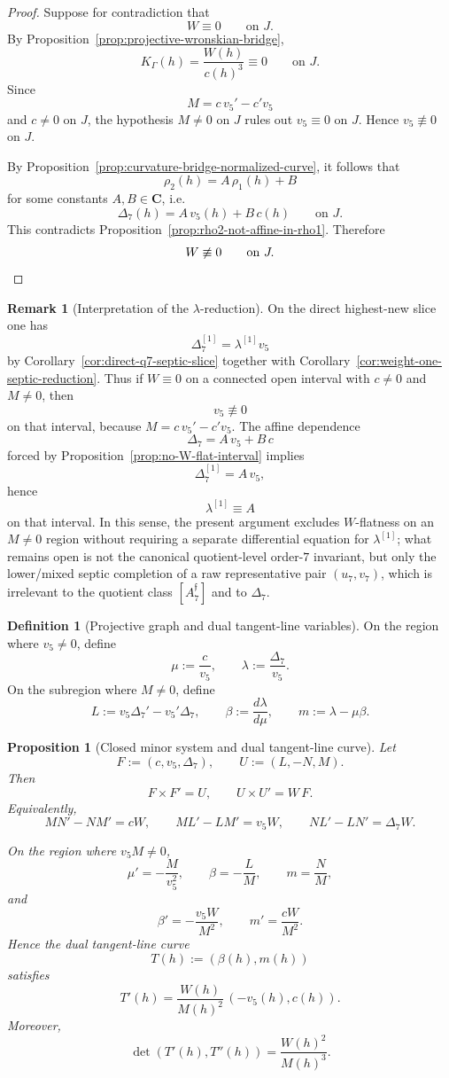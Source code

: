 \documentclass[11pt,a4paper]{amsart}
\theoremstyle{plain}
\newtheorem{proposition}[theorem]{Proposition}
\theoremstyle{definition}
\newtheorem{definition}[theorem]{Definition}
\newtheorem{remark}[theorem]{Remark}
\begin{document}
\begin{proof}
Suppose for contradiction that
\[
W\equiv 0
\qquad\text{on }J.
\]
By Proposition~\ref{prop:projective-wronskian-bridge},
\[
K_\Gamma(h)=\frac{W(h)}{c(h)^3}\equiv 0
\qquad\text{on }J.
\]
Since
\[
M=c\,v_5'-c'v_5
\]
and $c\neq 0$ on $J$, the hypothesis $M\neq 0$ on $J$ rules out
$v_5\equiv 0$ on $J$. Hence $v_5\not\equiv 0$ on $J$.

By Proposition~\ref{prop:curvature-bridge-normalized-curve}, it follows that
\[
\rho_2(h)=A\,\rho_1(h)+B
\]
for some constants $A,B\in\mathbf C$, i.e.
\[
\Delta_7(h)=A\,v_5(h)+B\,c(h)
\qquad\text{on }J.
\]
This contradicts Proposition~\ref{prop:rho2-not-affine-in-rho1}. Therefore
\[
W\not\equiv 0
\qquad\text{on }J.
\qedhere
\]
\end{proof}

\begin{remark}[Interpretation of the $\lambda$-reduction]
\label{rem:lambda-reduction-no-W-flatness}
On the direct highest-new slice one has
\[
\Delta_7^{[1]}=\lambda^{[1]}v_5
\]
by Corollary~\ref{cor:direct-q7-septic-slice} together with
Corollary~\ref{cor:weight-one-septic-reduction}. Thus if $W\equiv 0$ on a
connected open interval with $c\neq 0$ and $M\neq 0$, then
\[
v_5\not\equiv 0
\]
on that interval, because $M=c\,v_5'-c'v_5$. The affine dependence
\[
\Delta_7=A\,v_5+B\,c
\]
forced by Proposition~\ref{prop:no-W-flat-interval} implies
\[
\Delta_7^{[1]}=A\,v_5,
\]
hence
\[
\lambda^{[1]}\equiv A
\]
on that interval. In this sense, the present argument excludes $W$-flatness on
an $M\neq 0$ region without requiring a separate differential equation for
$\lambda^{[1]}$; what remains open is not the canonical quotient-level order-$7$
invariant, but only the lower/mixed septic completion of a raw representative
pair $(u_7,v_7)$, which is irrelevant to the quotient class
$[A_7^{\mathfrak f}]$ and to $\Delta_7$.
\end{remark}

\begin{definition}[Projective graph and dual tangent-line variables]
\label{def:mu-lambda-beta-m}
On the region where $v_5\neq 0$, define
\[
\mu:=\frac{c}{v_5},
\qquad
\lambda:=\frac{\Delta_7}{v_5}.
\]
On the subregion where $M\neq 0$, define
\[
L:=v_5\Delta_7'-v_5'\Delta_7,
\qquad
\beta:=\frac{d\lambda}{d\mu},
\qquad
m:=\lambda-\mu\beta.
\]
\end{definition}

\begin{proposition}[Closed minor system and dual tangent-line curve]
\label{prop:closed-minor-system-dual-curve}
Let
\[
F:=(c,v_5,\Delta_7),
\qquad
U:=(L,-N,M).
\]
Then
\[
F\times F'=U,
\qquad
U\times U'=W\,F.
\]
Equivalently,
\[
MN'-NM'=cW,
\qquad
ML'-LM'=v_5W,
\qquad
NL'-LN'=\Delta_7W.
\]

On the region where $v_5M\neq 0$,
\[
\mu'=-\frac{M}{v_5^2},
\qquad
\beta=-\frac{L}{M},
\qquad
m=\frac{N}{M},
\]
and
\[
\beta'=-\frac{v_5W}{M^2},
\qquad
m'=\frac{cW}{M^2}.
\]
Hence the dual tangent-line curve
\[
T(h):=(\beta(h),m(h))
\]
satisfies
\[
T'(h)=\frac{W(h)}{M(h)^2}\,(-v_5(h),c(h)).
\]
Moreover,
\[
\det(T'(h),T''(h))=\frac{W(h)^2}{M(h)^3}.
\]
\end{proposition}
\end{document}
